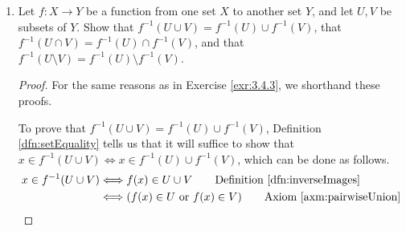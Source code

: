 \documentclass[../main.tex]{subfiles}
\begin{document}
\begin{enumerate}[ref={\thesection.\arabic*}]
\begin{proof}
\begin{align*}
        \end{align*}
        Because of the transitivity of logically equivalent statements (we may induct the result of Exercise \ref{exr:A.1.5}), we have shown what was desired.\par
        As to the other part of the question, it is \emph{not} true that the $\subseteq$ relation can be improved to $=$ for the first or the second statement, which we may verify thorugh two counterexamples, as follows. For the first statement, let $X=\{1,2\}$, $Y=\{3,4\}$, $A=\{1\}$, $B=\{2\}$, and $f:\{1,2\}\to\{3,4\}$ be defined by $f(x):=3$. Then we have $f(A)\cap f(B)=\{3\}$, but $f(A\cap B)=\{\}$. Thus, $3\in f(A)\cap f(B)$, but $3\notin f(A\cap B)$. Note that the break down in the would-be reverse proof of $f(A\cap B)\subseteq f(A)\cap f(B)$ comes from the fact that although $y\in f(A)\cap f(B) \Longrightarrow y=f(x)$ for some $x\in A$ and $y=f(x')$ for some $x'\in B$, we cannot guarantee that $x=x'$, i.e., that $x\in A\cap B$. As to the second statement, we consider the same function, except that we let $A=\{1,2\}$. Thus, we have $f(A\setminus B)=\{3\}$, but $f(A)\setminus f(B)=\{\}$, implying that $3\in f(A\setminus B)$ but $3\notin f(A)\setminus f(B)$. Note that the breakdown in the would-be reverse proof of $f(A)\setminus f(B)\subseteq f(A\setminus B)$ comes from the fact that although $y\in f(A\setminus B) \Longrightarrow y=f(x)$ for some $x\in A$, we cannot guarantee that there exists no $x'\in B$ such that $y=f(x')$.
    \end{proof}
    \item \label{exr:3.4.4}Let $f:X\to Y$ be a function from one set $X$ to another set $Y$, and let $U,V$ be subsets of $Y$. Show that $f^{-1}(U\cup V)=f^{-1}(U)\cup f^{-1}(V)$, that $f^{-1}(U\cap V)=f^{-1}(U)\cap f^{-1}(V)$, and that $f^{-1}(U\setminus V)=f^{-1}(U)\setminus f^{-1}(V)$.
    \begin{proof}
        For the same reasons as in Exercise \ref{exr:3.4.3}, we shorthand these proofs.\par
        To prove that $f^{-1}(U\cup V)=f^{-1}(U)\cup f^{-1}(V)$, Definition \ref{dfn:setEquality} tells us that it will suffice to show that $x\in f^{-1}(U\cup V) \Longleftrightarrow x\in f^{-1}(U)\cup f^{-1}(V)$, which can be done as follows.
        \begin{align*}
            x\in f^{-1}(U\cup V) &\Longleftrightarrow f(x)\in U\cup V \tag*{Definition \ref{dfn:inverseImages}}\\
            &\Longleftrightarrow (f(x)\in U\text{ or }f(x)\in V) \tag*{Axiom \ref{axm:pairwiseUnion}}\\

\end{align*}
\end{proof}
\end{enumerate}
\end{document}
